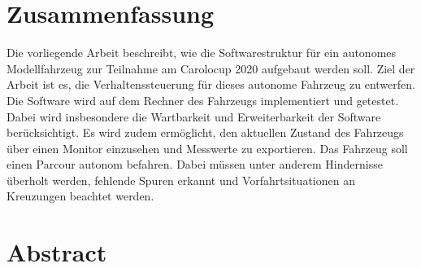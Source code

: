 



\chapter*{Zusammenfassung}
Die vorliegende Arbeit beschreibt, wie die Softwarestruktur für ein autonomes Modellfahrzeug zur Teilnahme am Carolocup 2020 aufgebaut werden soll. Ziel der Arbeit ist es, die Verhaltenssteuerung für dieses autonome Fahrzeug zu entwerfen. Die Software wird auf dem Rechner des Fahrzeugs implementiert und getestet. Dabei wird insbesondere die Wartbarkeit und Erweiterbarkeit der Software berücksichtigt. Es wird zudem ermöglicht, den aktuellen Zustand des Fahrzeugs über einen Monitor einzusehen und Messwerte zu exportieren. Das Fahrzeug soll einen Parcour autonom befahren. Dabei müssen unter anderem Hindernisse überholt werden, fehlende Spuren erkannt und Vorfahrtsituationen an Kreuzungen beachtet werden.
\chapter*{Abstract}

